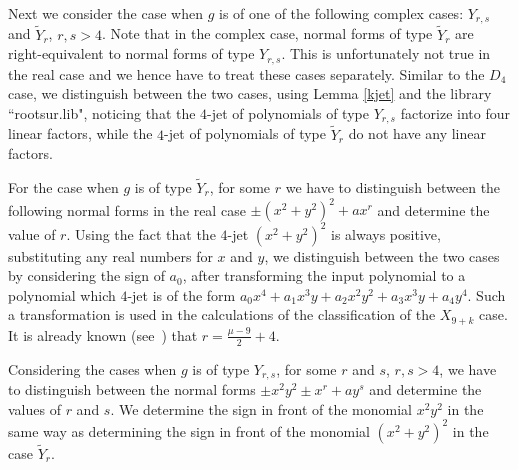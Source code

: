 \documentclass{amsproc}
\begin{document}
Next we consider the case when $g$ is of one of the following complex cases: $Y_{r,s}$ and $\widetilde Y_r$, $r,s>4$. Note that in the complex case, normal forms of type $\widetilde Y_r$ are right-equivalent to normal forms of type $Y_{r,s}$. This is unfortunately not true in the real case and we hence have to treat these cases separately.  Similar to the $D_4$ case, we distinguish between the two cases, using Lemma \ref{kjet} and the library ``rootsur.lib", noticing that the $4$-jet of polynomials of type $Y_{r,s}$ factorize into four linear factors, while the $4$-jet of polynomials of type $\widetilde Y_r$ do not have any linear factors.

For the case when $g$ is of type $\widetilde Y_r$, for some $r$ we have to distinguish between the following normal forms in the real case $\pm(x^2+y^2)^2+ax^r$ and determine the value of $r$. Using the fact that the $4$-jet $(x^2+y^2)^2$ is always positive, substituting any real numbers for $x$ and $y$,  we distinguish between the two cases by considering the sign of $a_0$, after transforming the input polynomial to a polynomial which $4$-jet is of the form $a_0x^4+a_1x^3y+a_2x^2y^2+a_3x^3y+a_4y^4$. Such a transformation is used in the calculations of the classification of the $X_{9+k}$ case. It is already known (see~\cite{AVG1985}) that $r=\frac{\mu-9}{2}+4$.

Considering the cases when $g$ is of type $Y_{r,s}$, for some $r$ and $s$, $r,s>4$, we have to distinguish between the normal forms $\pm x^2y^2\pm x^r+ay^s$ and determine the values of $r$ and $s$.  We determine the sign in front of the monomial $x^2y^2$ in the same way as determining the sign in front of the monomial $(x^2+y^2)^2$ in the case $\widetilde Y_r$.
\end{document}
